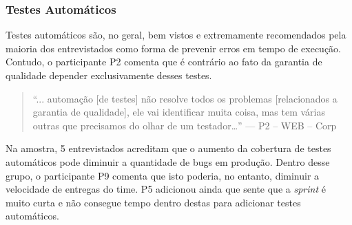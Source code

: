 \subsubsection{Testes Automáticos}

Testes automáticos são, no geral, bem vistos e extremamente recomendados pela maioria dos entrevistados como forma de prevenir erros em tempo de execução. Contudo, o participante P2 comenta que é contrário ao fato da garantia de qualidade depender exclusivamente desses testes.

\begin{quote}
    ``... automação [de testes] não resolve todos os problemas [relacionados a garantia de qualidade], ele vai identificar muita coisa, mas tem várias outras que precisamos do olhar de um testador…'' --- P2 -- WEB -- Corp
\end{quote}

Na amostra, 5 entrevistados acreditam que o aumento da cobertura de testes automáticos pode diminuir a quantidade de bugs em produção. Dentro desse grupo, o participante P9 comenta que isto poderia, no entanto, diminuir a velocidade de entregas do time. P5 adicionou ainda que sente que a \emph{sprint} é muito curta e não consegue tempo dentro destas para adicionar testes automáticos.